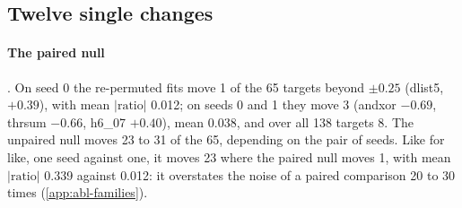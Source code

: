 \subsection{Twelve single changes}\label{sec:abl-single}

\begin{table}[t]
\centering{\footnotesize\setlength{\tabcolsep}{2.4pt}\renewcommand{\arraystretch}{1.05}
}
\caption{The 12 ablations of Q5 on the 65 targets of the five ablation suites, against DFG alone on the same seeds and training sets . Each cell gives the mean $\log_2$ ratio of the run's $\nstar$ to DFG alone's over the targets both learn; below it, the targets on which the run needs clearly less / clearly more data, and in brackets the number both learn. ``Newly never'': targets the run never brings to 10\% error by $n=16384$ while DFG alone does. The three targets that DFG alone never learns (fd\_10, h6\_00, f7\_05) are in no mean. Bottom: the paired null (post hoc) and the protocol's unpaired null. Sources:  (\texttt{q5\_ablations}) and  via ; by family in \cref{tab:abl-family}, per target in \cref{fig:ablations}.}
\label{tab:ablations}
\end{table}

\paragraph{The paired null} . On seed 0 the re-permuted fits move 1 of the 65 targets beyond $\pm0.25$ (dlist5, $+0.39$), with mean $|\text{ratio}|$ 0.012; on seeds 0 and 1 they move 3 (andxor $-0.69$, thrsum $-0.66$, h6\_07 $+0.40$), mean 0.038, and over all 138 targets 8. The unpaired null moves 23 to 31 of the 65, depending on the pair of seeds. Like for like, one seed against one, it moves 23 where the paired null moves 1, with mean $|\text{ratio}|$ 0.339 against 0.012: it overstates the noise of a paired comparison 20 to 30 times (\cref{app:abl-families}).

